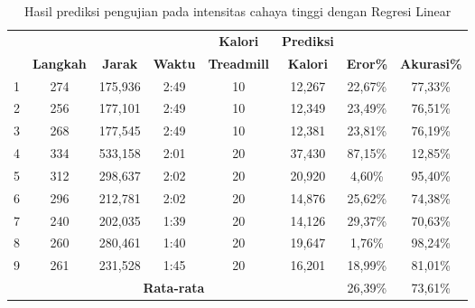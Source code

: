 \begin{longtable}{|c|c|c|c|c|c|c|c|}
  \caption{Hasil prediksi pengujian pada intensitas cahaya tinggi dengan Regresi Linear}
  \label{tb:PengujianIntensitasTinggiAnalisaPrediksiRegresi}                                   \\
  \hline
  \rowcolor[HTML]{C0C0C0}
  & & & & \textbf{Kalori} & \textbf{Prediksi} & & \\
  \rowcolor[HTML]{C0C0C0}
  \multirow{-2}{*}{\textbf{Percobaan}} & \multirow{-2}{*}{\textbf{Langkah}} & \multirow{-2}{*}{\textbf{Jarak}} & \multirow{-2}{*}{\textbf{Waktu}} & \textbf{Treadmill} & \textbf{Kalori} & \multirow{-2}{*}{\textbf{Eror\%}} & \multirow{-2}{*}{\textbf{Akurasi\%}} \\
  
  \hline
  1   & 274   & 175,936    & 2:49    & 10    & 12,267   & 22,67\%      & 77,33\%   \\
  \hline  
  2   & 256   & 177,101    & 2:49    & 10    & 12,349   & 23,49\%      & 76,51\%  \\
  \hline
  3   & 268   & 177,545    & 2:49    & 10    & 12,381   & 23,81\%      & 76,19\%   \\
  \hline
  4   & 334   & 533,158    & 2:01    & 20    & 37,430   & 87,15\%      & 12,85\%  \\
  \hline
  5   & 312   & 298,637    & 2:02    & 20    & 20,920   & 4,60\%       & 95,40\%    \\
  \hline
  6   & 296   & 212,781    & 2:02    & 20    & 14,876   & 25,62\%      & 74,38\%   \\
  \hline
  7   & 240   & 202,035    & 1:39    & 20    & 14,126   & 29,37\%      & 70,63\%   \\
  \hline
  8   & 260   & 280,461    & 1:40    & 20    & 19,647   & 1,76\%       & 98,24\%   \\
  \hline
  9   & 261   & 231,528    & 1:45    & 20    & 16,201   & 18,99\%      & 81,01\%   \\
  \hline

  \multicolumn{6}{|c|}{\textbf{Rata-rata}} & 26,39\% & 73,61\% \\
  \hline
\end{longtable}

